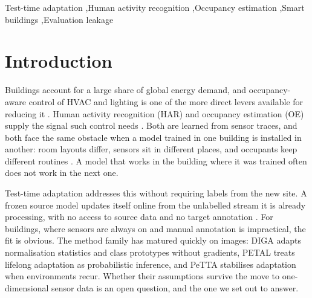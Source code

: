 \documentclass[a4paper,fleqn]{cas-dc}
\begin{document}
\begin{keywords}
Test-time adaptation \sep Human activity recognition \sep Occupancy estimation
\sep Smart buildings \sep Evaluation leakage
\end{keywords}

\maketitle

\section{Introduction}
\label{sec:intro}

Buildings account for a large share of global energy demand, and occupancy-aware control
of HVAC and lighting is one of the more direct levers available for reducing it
\cite{manfren2021,amangeldy2025}. Human activity recognition (HAR) and occupancy
estimation (OE) supply the signal such control needs \cite{dridi2022,amayri2019}. Both are
learned from sensor traces, and both face the same obstacle when a model trained in one
building is installed in another: room layouts differ, sensors sit in different places,
and occupants keep different routines \cite{shahbazian2023,hong2017}. A model that works
in the building where it was trained often does not work in the next one.

Test-time adaptation addresses this without requiring labels from the new site. A frozen
source model updates itself online from the unlabelled stream it is already processing,
with no access to source data and no target annotation \cite{liang2024}. For buildings,
where sensors are always on and manual annotation is impractical, the fit is obvious. The
method family has matured quickly on images: DIGA \cite{diga} adapts normalisation
statistics and class prototypes without gradients, PETAL \cite{petal} treats lifelong
adaptation as probabilistic inference, and PeTTA \cite{petta} stabilises adaptation when
environments recur. Whether their assumptions survive the move to one-dimensional sensor
data is an open question, and the one we set out to answer.
\end{document}
